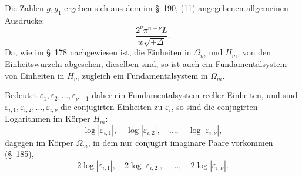 \documentclass[11pt]{article}
\newcommand{\eps}{\varepsilon}
\begin{document}
Die Zahlen $g,g_1$ ergeben sich aus dem im \S~190, (11) angegebenen allgemeinen Ausdrucke:
\begin{equation}
\frac{2^\nu\pi^{n-\nu}L}{w\sqrt{\pm\Delta}}.
\tag{11}
\end{equation}
Da, wie im \S~178 nachgewiesen ist, die Einheiten in $\Omega_m$ und $H_m$, von den Einheitswurzeln abgesehen, dieselben sind, so ist auch ein Fundamentalsystem von Einheiten in $H_m$ zugleich ein Fundamentalsystem in $\Omega_m$.

Bedeutet $\eps_1,\eps_2,\ldots,\eps_{\nu-1}$ daher ein Fundamentalsystem reeller Einheiten, und sind $\eps_{i,1},\eps_{i,2},\ldots,\eps_{i,\nu}$ die conjugirten Einheiten zu $\eps_i$, so sind die conjugirten Logarithmen im Körper $H_m$:
\[
\log|\eps_{i,1}|,\quad\log|\eps_{i,2}|,\quad\ldots,\quad\log|\eps_{i,\nu}|,
\]
dagegen im Körper $\Omega_m$, in dem nur conjugirt imaginäre Paare vorkommen (\S~185),
\[
2\log|\eps_{i,1}|,\quad2\log|\eps_{i,2}|,\quad\ldots,\quad2\log|\eps_{i,\nu}|.
\]
\end{document}
